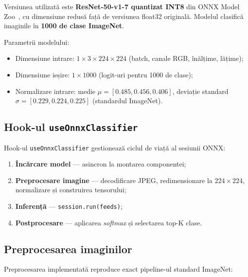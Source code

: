 \documentclass[12pt, a4paper, twoside]{report}
\numberwithin{equation}{section}
\begin{document}
Versiunea utilizată este \textbf{ResNet-50-v1-7 quantizat INT8} din ONNX Model Zoo~\cite{onnxmodelzoo},
cu dimensiune redusă față de versiunea float32 originală. Modelul clasifică imaginile
în \textbf{1000 de clase ImageNet}.

Parametrii modelului:
\begin{itemize}
  \item Dimensiune intrare: $1 \times 3 \times 224 \times 224$ (batch, canale RGB, înălțime, lățime);
  \item Dimensiune ieșire: $1 \times 1000$ (logit-uri pentru 1000 de clase);
  \item Normalizare intrare: medie $\mu = [0.485, 0.456, 0.406]$, deviație standard
    $\sigma = [0.229, 0.224, 0.225]$ (standardul ImageNet).
\end{itemize}

\subsection{Hook-ul \texttt{useOnnxClassifier}}

Hook-ul \texttt{useOnnxClassifier} gestionează ciclul de viață al sesiunii ONNX:
\begin{enumerate}
  \item \textbf{Încărcare model} — asincron la montarea componentei;
  \item \textbf{Preprocesare imagine} — decodificare JPEG, redimensionare la $224\times224$,
    normalizare și construirea tensorului;
  \item \textbf{Inferență} — \texttt{session.run(feeds)};
  \item \textbf{Postprocesare} — aplicarea \textit{softmax} și selectarea top-K clase.
\end{enumerate}

\subsection{Preprocesarea imaginilor}

Preprocesarea implementată reproduce exact pipeline-ul standard ImageNet:
\end{document}
